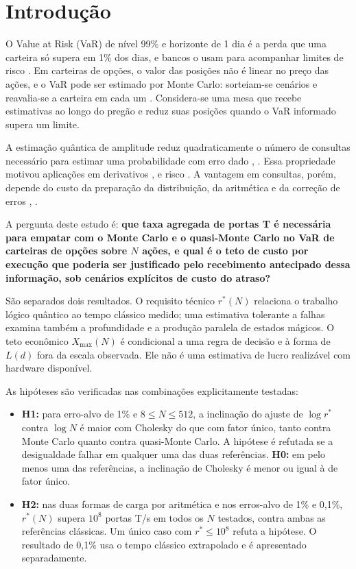 \documentclass[conference,a4paper]{IEEEtran}
\providecommand{\tightlist}{\setlength{\itemsep}{0pt}\setlength{\parskip}{0pt}}
\begin{document}
\section{Introdução}\label{introduuxe7uxe3o}

O Value at Risk (VaR) de nível 99\% e horizonte de 1 dia é a perda que uma carteira só supera em 1\% dos dias, e bancos o usam para acompanhar limites de risco \cite{jorion2007var}. Em carteiras de opções, o valor das posições não é linear no preço das ações, e o VaR pode ser estimado por Monte Carlo: sorteiam-se cenários e reavalia-se a carteira em cada um \cite{glasserman2003montecarlo}. Considera-se uma mesa que recebe estimativas ao longo do pregão e reduz suas posições quando o VaR informado supera um limite.

A estimação quântica de amplitude reduz quadraticamente o número de consultas necessário para estimar uma probabilidade com erro dado \cite{brassard2002qae}, \cite{montanaro2015montecarlo}. Essa propriedade motivou aplicações em derivativos \cite{rebentrost2018finance}, \cite{stamatopoulos2020option} e risco \cite{woerner2019risk}. A vantagem em consultas, porém, depende do custo da preparação da distribuição, da aritmética e da correção de erros \cite{chakrabarti2021threshold}, \cite{herbert2021groverrudolph}.

A pergunta deste estudo é: \textbf{que taxa agregada de portas T é necessária para empatar com o Monte Carlo e o quasi-Monte Carlo no VaR de carteiras de opções sobre \(N\) ações, e qual é o teto de custo por execução que poderia ser justificado pelo recebimento antecipado dessa informação, sob cenários explícitos de custo do atraso?}

São separados dois resultados. O requisito técnico \(r^*(N)\) relaciona o trabalho lógico quântico ao tempo clássico medido; uma estimativa tolerante a falhas examina também a profundidade e a produção paralela de estados mágicos. O teto econômico \(X_{\max}(N)\) é condicional a uma regra de decisão e à forma de \(L(d)\) fora da escala observada. Ele não é uma estimativa de lucro realizável com hardware disponível.

As hipóteses são verificadas nas combinações explicitamente testadas:

\begin{itemize}
\tightlist
\item
  \textbf{H1:} para erro-alvo de 1\% e \(8 \leq N \leq 512\), a inclinação do ajuste de \(\log r^*\) contra \(\log N\) é maior com Cholesky do que com fator único, tanto contra Monte Carlo quanto contra quasi-Monte Carlo. A hipótese é refutada se a desigualdade falhar em qualquer uma das duas referências. \textbf{H0:} em pelo menos uma das referências, a inclinação de Cholesky é menor ou igual à de fator único.
\item
  \textbf{H2:} nas duas formas de carga por aritmética e nos erros-alvo de 1\% e 0,1\%, \(r^*(N)\) supera \(10^8\) portas T/s em todos os \(N\) testados, contra ambas as referências clássicas. Um único caso com \(r^* \leq 10^8\) refuta a hipótese. O resultado de 0,1\% usa o tempo clássico extrapolado e é apresentado separadamente.
\end{itemize}
\end{document}
